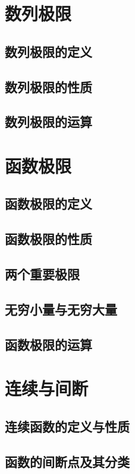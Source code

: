 \section{数列极限}
\subsection{数列极限的定义}
\subsection{数列极限的性质}
\subsection{数列极限的运算}

\section{函数极限}
\subsection{函数极限的定义}
\subsection{函数极限的性质}
\subsection{两个重要极限}
\subsection{无穷小量与无穷大量}
\subsection{函数极限的运算}
\section{连续与间断}
\subsection{连续函数的定义与性质}
\subsection{函数的间断点及其分类}

\begin{example}
	
	
	\fillparen[ ]
	\begin{choices}[columns=5]
		\item 
		\item 
		\item 
		\item 
		\item 	
	\end{choices}
	\vspace{3cm} 
\end{example}
\begin{solution}
	
\end{solution}
